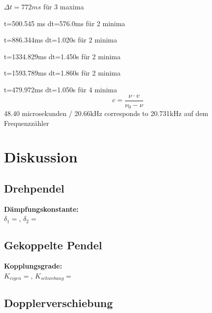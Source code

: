 \documentclass{article}
\begin{document}
$\Delta t=772ms$ für 3 maxima

t=500.545 ms
dt=576.0ms für 2 minima

t=886.344ms
dt=1.020s für 2 minima

t=1334.829ms
dt=1.450s für 2 minima

t=1593.789ms
dt=1.860s für 2 minima

t=479.972ms
dt=1.050s für 4 minima
\begin{equation}
\label{Schallgeschw}
c=\frac{\nu\cdot v}{\nu_{0}-\nu}
\end{equation}
48.40 microsekunden / 20.66kHz corresponds to 20.731kHz auf dem Frequenzzähler

\section{Diskussion}
\subsection*{Drehpendel}
\textbf{Dämpfungskonstante:}\\
$\delta_1=$, $\delta_2=$

\subsection*{Gekoppelte Pendel}
\textbf{Kopplungsgrade:}\\
$K_{eigen}=$, $K_{schwebung}=$
\subsection*{Dopplerverschiebung}



\end{document}
